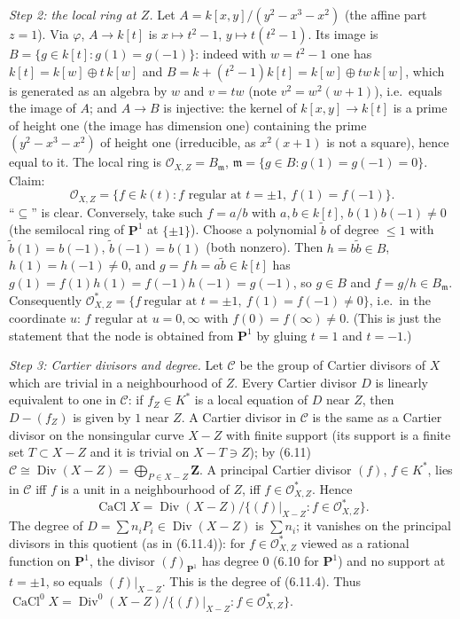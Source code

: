 \documentclass[11pt]{article}
\begin{document}
\emph{Step 2: the local ring at $Z$.} Let $A=k[x,y]/(y^2-x^3-x^2)$ (the affine part $z=1$). Via $\varphi$, $A\to k[t]$ is $x\mapsto t^2-1$, $y\mapsto t(t^2-1)$. Its image is $B=\{g\in k[t]:g(1)=g(-1)\}$: indeed with $w=t^2-1$ one has $k[t]=k[w]\oplus t\,k[w]$ and $B=k+(t^2-1)k[t]=k[w]\oplus tw\,k[w]$, which is generated as an algebra by $w$ and $v=tw$ (note $v^2=w^2(w+1)$), i.e.\ equals the image of $A$; and $A\to B$ is injective: the kernel of $k[x,y]\to k[t]$ is a prime of height one (the image has dimension one) containing the prime $(y^2-x^3-x^2)$ of height one (irreducible, as $x^2(x+1)$ is not a square), hence equal to it. The local ring is $\mathcal O_{X,Z}=B_{\mathfrak m}$, $\mathfrak m=\{g\in B:g(1)=g(-1)=0\}$. Claim:
\[
\mathcal O_{X,Z}=\{f\in k(t):f\text{ regular at }t=\pm1,\ f(1)=f(-1)\}.
\]
``$\subseteq$'' is clear. Conversely, take such $f=a/b$ with $a,b\in k[t]$, $b(1)b(-1)\neq0$ (the semilocal ring of $\mathbf P^1$ at $\{\pm1\}$). Choose a polynomial $\tilde b$ of degree $\le1$ with $\tilde b(1)=b(-1)$, $\tilde b(-1)=b(1)$ (both nonzero). Then $h=b\tilde b\in B$, $h(1)=h(-1)\ne0$, and $g=f\,h=a\tilde b\in k[t]$ has $g(1)=f(1)h(1)=f(-1)h(-1)=g(-1)$, so $g\in B$ and $f=g/h\in B_{\mathfrak m}$. Consequently $\mathcal O_{X,Z}^*=\{f\ \text{regular at }t=\pm1,\ f(1)=f(-1)\ne0\}$, i.e.\ in the coordinate $u$: $f$ regular at $u=0,\infty$ with $f(0)=f(\infty)\ne0$. (This is just the statement that the node is obtained from $\mathbf P^1$ by gluing $t=1$ and $t=-1$.)

\emph{Step 3: Cartier divisors and degree.} Let $\mathcal C$ be the group of Cartier divisors of $X$ which are trivial in a neighbourhood of $Z$. Every Cartier divisor $D$ is linearly equivalent to one in $\mathcal C$: if $f_Z\in K^*$ is a local equation of $D$ near $Z$, then $D-(f_Z)$ is given by $1$ near $Z$. A Cartier divisor in $\mathcal C$ is the same as a Cartier divisor on the nonsingular curve $X-Z$ with finite support (its support is a finite set $T\subset X-Z$ and it is trivial on $X-T\ni Z$); by (6.11) $\mathcal C\cong\operatorname{Div}(X-Z)=\bigoplus_{P\in X-Z}\mathbf Z$. A principal Cartier divisor $(f)$, $f\in K^*$, lies in $\mathcal C$ iff $f$ is a unit in a neighbourhood of $Z$, iff $f\in\mathcal O_{X,Z}^*$. Hence
\[
\operatorname{CaCl}X=\operatorname{Div}(X-Z)\big/\{(f)|_{X-Z}:f\in\mathcal O_{X,Z}^*\}.
\]
The degree of $D=\sum n_iP_i\in\operatorname{Div}(X-Z)$ is $\sum n_i$; it vanishes on the principal divisors in this quotient (as in (6.11.4)): for $f\in\mathcal O_{X,Z}^*$ viewed as a rational function on $\mathbf P^1$, the divisor $(f)_{\mathbf P^1}$ has degree $0$ (6.10 for $\mathbf P^1$) and no support at $t=\pm1$, so equals $(f)|_{X-Z}$. This is the degree of (6.11.4). Thus $\operatorname{CaCl}^0X=\operatorname{Div}^0(X-Z)/\{(f)|_{X-Z}:f\in\mathcal O_{X,Z}^*\}$.
\end{document}
